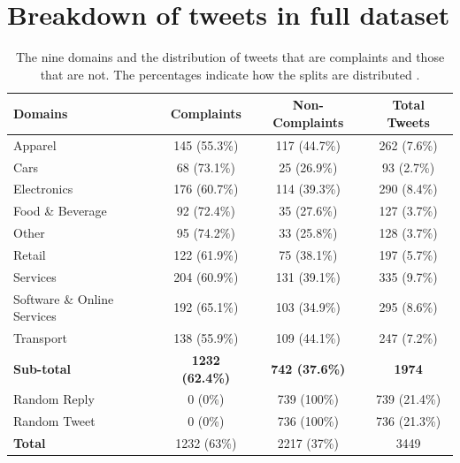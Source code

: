 \section{Breakdown of tweets in full dataset}
\begin{table}[ht]
    \captionsetup{font=small}
    \centering
    \begin{tabularx}{\textwidth}{|X|c|c|c|}
        \hline
        \rowcolor[gray]{0.7}
        \textbf{Domains}            & \textbf{Complaints}   & \textbf{Non-Complaints} & \textbf{Total Tweets} \\
        \hline
        Apparel                     & 145 \small{(55.3\%)}  & 117 \small{(44.7\%)}    & 262 \small{(7.6\%)}   \\
        \hline
        Cars                        & 68 \small{(73.1\%)}   & 25 \small{(26.9\%)}     & 93 \small{(2.7\%)}    \\
        \hline
        Electronics                 & 176 \small{(60.7\%)}  & 114 \small{(39.3\%)}    & 290 \small{(8.4\%)}   \\
        \hline
        Food \& Beverage            & 92 \small{(72.4\%)}   & 35 \small{(27.6\%)}     & 127 \small{(3.7\%)}   \\
        \hline
        Other                       & 95 \small{(74.2\%)}   & 33 \small{(25.8\%)}     & 128 \small{(3.7\%)}   \\
        \hline
        Retail                      & 122 \small{(61.9\%)}  & 75 \small{(38.1\%)}     & 197 \small{(5.7\%)}   \\
        \hline
        Services                    & 204 \small{(60.9\%)}  & 131 \small{(39.1\%)}    & 335 \small{(9.7\%)}   \\
        \hline
        Software \& Online Services & 192 \small{(65.1\%)}  & 103 \small{(34.9\%)}    & 295 \small{(8.6\%)}   \\
        \hline
        Transport                   & 138 \small{(55.9\%)}  & 109 \small{(44.1\%)}    & 247 \small{(7.2\%)}   \\
        \hline
        \rowcolor[gray]{0.9}
        \textbf{Sub-total}          & \textbf{1232 \small{(62.4\%)}} & \textbf{742 \small{(37.6\%)}} & \textbf{1974}  \\
        \hline
        \hline
        Random Reply                & 0 \small{(0\%)}       & 739 \small{(100\%)}     & 739 \small{(21.4\%)}  \\
        \hline
        Random Tweet                & 0 \small{(0\%)}       & 736 \small{(100\%)}     & 736 \small{(21.3\%)}  \\
        \hline
        \hline
        \rowcolor[gray]{0.9}
        \textbf{Total}              & 1232 \small{(63\%)}   & 2217 \small{(37\%)}      & 3449                  \\
        \hline
    \end{tabularx}
    \caption{The nine domains and the distribution of tweets that are complaints and those that are not. The percentages indicate how the splits are distributed \cite{preotiuc-pietro_automatically_2019}.}
    \label{tab: fulldataset_breakdown}
\end{table}


